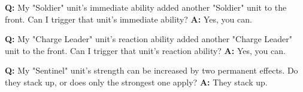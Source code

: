 \documentclass[a4paper]{article}
\begin{document}
    \hspace{-2em}
    \textbf{Q:} My "Soldier" unit's immediate ability added another "Soldier"
    unit to the front. Can I trigger that unit's immediate ability?
    \newline
    \textbf{A:} Yes, you can.
    
    \hspace{-2em}
    \textbf{Q:} My "Charge Leader" unit's reaction ability added another
    "Charge Leader" unit to the front. Can I trigger that unit's reaction ability?
    \newline
    \textbf{A:} Yes, you can.
    
    \hspace{-2em}
    \textbf{Q:} My "Sentinel" unit's strength can be increased by two permanent effects.
    Do they stack up, or does only the strongest one apply?
    \newline
    \textbf{A:} They stack up.
    
    
    
\end{document}
